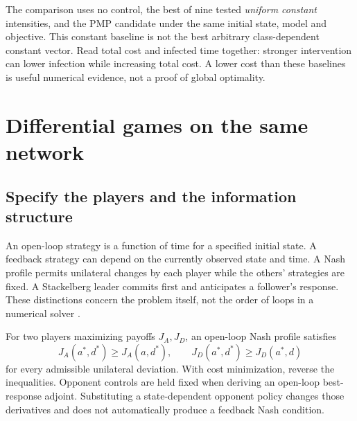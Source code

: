\documentclass[11pt,a4paper]{article}
\theoremstyle{definition}
\theoremstyle{remark}
\begin{document}
The comparison uses no control, the best of nine tested \emph{uniform constant} intensities, and the PMP candidate under the same initial state, model and objective. This constant baseline is not the best arbitrary class-dependent constant vector. Read total cost and infected time together: stronger intervention can lower infection while increasing total cost. A lower cost than these baselines is useful numerical evidence, not a proof of global optimality.

\section{Differential games on the same network}
\subsection{Specify the players and the information structure}
An open-loop strategy is a function of time for a specified initial state. A feedback strategy can depend on the currently observed state and time. A Nash profile permits unilateral changes by each player while the others' strategies are fixed. A Stackelberg leader commits first and anticipates a follower's response. These distinctions concern the problem itself, not the order of loops in a numerical solver \cite{basar}.

For two players maximizing payoffs $J_A,J_D$, an open-loop Nash profile satisfies
\begin{equation}
J_A(a^*,d^*)\ge J_A(a,d^*),\qquad
J_D(a^*,d^*)\ge J_D(a^*,d)
\end{equation}
for every admissible unilateral deviation. With cost minimization, reverse the inequalities. Opponent controls are held fixed when deriving an open-loop best-response adjoint. Substituting a state-dependent opponent policy changes those derivatives and does not automatically produce a feedback Nash condition.
\end{document}
